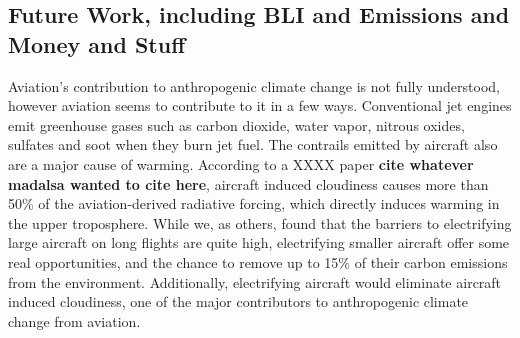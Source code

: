 \documentclass{achemso}
\begin{document}
\subsection{Future Work, including BLI and Emissions and Money and Stuff}

Aviation's contribution to anthropogenic climate change is not fully understood, however aviation seems to contribute to it in a few ways. Conventional jet engines emit greenhouse gases such as carbon dioxide, water vapor, nitrous oxides, sulfates and soot when they burn jet fuel. The contrails emitted by aircraft also are a major cause of warming. According to a XXXX paper \textbf{cite whatever madalsa wanted to cite here}, aircraft induced cloudiness causes more than 50\% of the aviation-derived radiative forcing, which directly induces warming in the upper troposphere. While we, as others, found that the barriers to electrifying large aircraft on long flights are quite high, electrifying smaller aircraft offer some real opportunities, and the chance to remove up to 15\% of their carbon emissions from the environment. Additionally, electrifying aircraft would eliminate aircraft induced cloudiness, one of the major contributors to anthropogenic climate change from aviation. 




\end{document}
